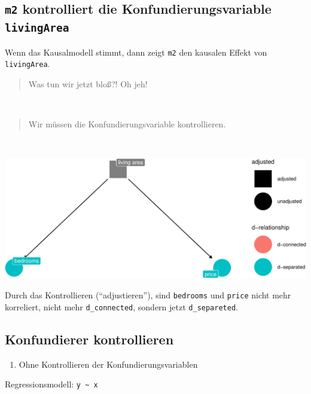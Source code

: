 \documentclass[
  a4paper,
  DIV=11]{scrreprt}
\providecommand{\tightlist}{%
  \setlength{\itemsep}{0pt}\setlength{\parskip}{0pt}}\usepackage{longtable,booktabs,array}
\theoremstyle{definition}
\theoremstyle{remark}
\begin{document}
\hypertarget{m2-kontrolliert-die-konfundierungsvariable-livingarea}{%
\subsection{\texorpdfstring{\texttt{m2} kontrolliert die
Konfundierungsvariable
\texttt{livingArea}}{m2 kontrolliert die Konfundierungsvariable livingArea}}\label{m2-kontrolliert-die-konfundierungsvariable-livingarea}}

Wenn das Kausalmodell stimmt, dann zeigt \texttt{m2} den kausalen Effekt
von \texttt{livingArea}.

\begin{quote}
Was tun wir jetzt bloß?! Oh jeh!
\end{quote}

🧑

\begin{quote}
Wir müssen die Konfundierungsvariable kontrollieren.
\end{quote}

👩

\includegraphics{./kausal_files/figure-pdf/confounder-triangle-1.pdf}

Durch das Kontrollieren (``adjustieren''), sind \texttt{bedrooms} und
\texttt{price} nicht mehr korreliert, nicht mehr \texttt{d\_connected},
sondern jetzt \texttt{d\_separeted}.

\hypertarget{konfundierer-kontrollieren}{%
\subsection{Konfundierer
kontrollieren}\label{konfundierer-kontrollieren}}

\begin{enumerate}
\def\labelenumi{\arabic{enumi}.}
\tightlist
\item
  Ohne Kontrollieren der Konfundierungsvariablen
\end{enumerate}

Regressionsmodell: \texttt{y\ \textasciitilde{}\ x}
\end{document}
